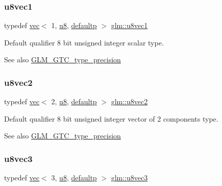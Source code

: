 \subsubsection{\texorpdfstring{u8vec1}{u8vec1}}
{\footnotesize\ttfamily typedef \hyperlink{structglm_1_1vec}{vec}$<$ 1, \hyperlink{group__gtc__type__precision_ga5e3dc67373d5068997d2d9f41c9024d2}{u8}, \hyperlink{namespaceglm_a36ed105b07c7746804d7fdc7cc90ff25a9d21ccd8b5a009ec7eb7677befc3bf51}{defaultp} $>$ \hyperlink{group__gtc__type__precision_ga5b0875b5979b80a0ccb371bf7f0f95d8}{glm\+::u8vec1}}

Default qualifier 8 bit unsigned integer scalar type. \begin{DoxySeeAlso}{See also}
\hyperlink{group__gtc__type__precision}{G\+L\+M\+\_\+\+G\+T\+C\+\_\+type\+\_\+precision} 
\end{DoxySeeAlso}
\mbox{\label{group__gtc__type__precision_ga01e28d0272428f94d22ea6111f0112be}} 
\subsubsection{\texorpdfstring{u8vec2}{u8vec2}}
{\footnotesize\ttfamily typedef \hyperlink{structglm_1_1vec}{vec}$<$ 2, \hyperlink{group__gtc__type__precision_ga5e3dc67373d5068997d2d9f41c9024d2}{u8}, \hyperlink{namespaceglm_a36ed105b07c7746804d7fdc7cc90ff25a9d21ccd8b5a009ec7eb7677befc3bf51}{defaultp} $>$ \hyperlink{group__gtc__type__precision_ga01e28d0272428f94d22ea6111f0112be}{glm\+::u8vec2}}

Default qualifier 8 bit unsigned integer vector of 2 components type. \begin{DoxySeeAlso}{See also}
\hyperlink{group__gtc__type__precision}{G\+L\+M\+\_\+\+G\+T\+C\+\_\+type\+\_\+precision} 
\end{DoxySeeAlso}
\mbox{\label{group__gtc__type__precision_gaa86b325e581afdc643495fbe428c1f1b}} 
\subsubsection{\texorpdfstring{u8vec3}{u8vec3}}
{\footnotesize\ttfamily typedef \hyperlink{structglm_1_1vec}{vec}$<$ 3, \hyperlink{group__gtc__type__precision_ga5e3dc67373d5068997d2d9f41c9024d2}{u8}, \hyperlink{namespaceglm_a36ed105b07c7746804d7fdc7cc90ff25a9d21ccd8b5a009ec7eb7677befc3bf51}{defaultp} $>$ \hyperlink{group__gtc__type__precision_gaa86b325e581afdc643495fbe428c1f1b}{glm\+::u8vec3}}

